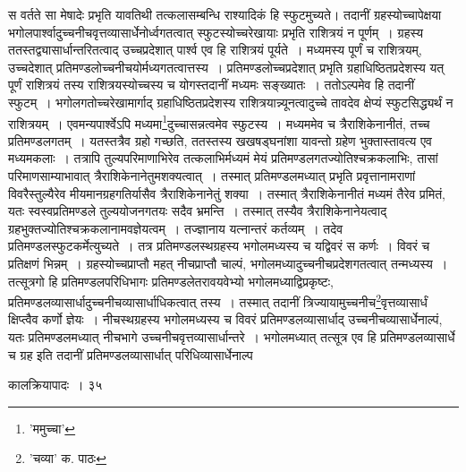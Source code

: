 \documentclass[11pt, openany]{book}
\begin{document}
{{{{\vspace{0.3cm}
\noindent स वर्तते सा मेषादेः प्रभृति यावतिथी तत्कलासम्बन्धि राश्यादिकं हि स्फुटमुच्यते। तदानीं ग्रहस्योच्चापेक्षया
भगोलपार्श्वादुच्चनीचवृत्तव्यासार्धेनोर्ध्वगतत्वात् स्फुटस्योच्चरेखायाः प्रभृति राशित्रयं न पूर्णम्~। ग्रहस्य ततस्तद्व्यासार्धान्तरितत्वाद् उच्चप्रदेशात् पार्श्व एव हि राशित्रयं पूर्यते~। मध्यमस्य पूर्णं च राशित्रयम्, उच्चदेशात् प्रतिमण्डलोच्चनीचयोर्मध्यगतत्वात्तस्य~। प्रतिमण्डलोच्चप्रदेशात् प्रभृति ग्रहाधिष्ठितप्रदेशस्य यत् पूर्णं राशित्रयं तस्य राशित्रयस्योच्चस्य च योगस्तदानीं मध्यमः सङ्ख्यातः~। ततोऽल्पमेव हि तदानीं स्फुटम्~। भगोलगतोच्चरेखामार्गाद् ग्रहाधिष्ठितप्रदेशस्य राशित्रयान्न्यूनत्वादुच्चे तावदेव क्षेप्यं स्फुटसिद्ध्यर्थं न राशित्रयम्~। एवमन्यपार्श्वेऽपि मध्यमा\renewcommand{\thefootnote}{१}\footnote{'ममुच्चा'}दुच्चासन्नत्वमेव स्फुटस्य~। मध्यममेव च
त्रैराशिकेनानीतं, तच्च प्रतिमण्डलगतम्~। यतस्तत्रैव ग्रहो गच्छति, ततस्तस्य खखषड्घनांशा यावन्तो ग्रहेण भुक्तास्तावत्य एव मध्यमकलाः~। तत्रापि तुल्यपरिमाणाभिरेव तत्कलाभिर्मध्यमं मेयं प्रतिमण्डलगतज्योतिश्चक्रकलाभिः, तासां परिमाणसाम्याभावात् त्रैराशिकेनानेतुमशक्यत्वात्~। तस्मात् प्रतिमण्डलमध्यात् प्रभृति प्रवृत्तानामराणां विवरैस्तुल्यैरेव मीयमानग्रहगतिर्यासैव त्रैराशिकेनानेतुं शक्या~। तस्मात् त्रैराशिकेनानीतं मध्यमं तैरेव प्रमितं, यतः स्वस्वप्रतिमण्डले तुल्ययोजनगतयः सदैव भ्रमन्ति~। तस्मात् तस्यैव त्रैराशिकेनानेयत्वाद् ग्रहभुक्तज्योतिश्चक्रकलानामवज्ञेयत्वम्~।
तज्ज्ञानाय यत्नान्तरं कर्तव्यम्~। तदेव प्रतिमण्डलस्फुटकर्मेत्युच्यते~। तत्र प्रतिमण्डलस्थग्रहस्य भगोलमध्यस्य च यद्विवरं स कर्णः~। विवरं च प्रतिक्षणं भिन्नम्~। ग्रहस्योच्चप्राप्तौ महत् नीचप्राप्तौ चाल्पं, भगोलमध्यादुच्चनीचप्रदेशगतत्वात् तन्मध्यस्य~। तत्सूत्रगो हि प्रतिमण्डलपरिधिभागः प्रतिमण्डलेतरावयवेभ्यो भगोलमध्याद्विप्रकृष्टः, प्रतिमण्डलव्यासार्धादुच्चनीचव्यासार्धाधिकत्वात् तस्य~। तस्मात् तदानीं त्रिज्यायामुच्चनीच\renewcommand{\thefootnote}{२}\footnote{'चव्या' क. पाठः}वृत्तव्यासार्धं क्षिप्त्वैव कर्णो ज्ञेयः~। नीचस्थग्रहस्य भगोलमध्यस्य च विवरं प्रतिमण्डलव्यासार्धाद् उच्चनीचव्यासार्धेनाल्पं, यतः प्रतिमण्डलमध्यात् नीचभागे उच्चनीचवृत्तव्यासार्धान्तरे~। भगोलमध्यात् तत्सूत्र एव हि प्रतिमण्डलव्यासार्धे च ग्रह इति तदानीं प्रतिमण्डलव्यासार्धात्
परिधिव्यासार्धेनाल्प

\newpage

\vspace{3cm}\hspace{4cm} कालक्रियापादः~। \hspace{4cm}३५

}}}}
\end{document}
